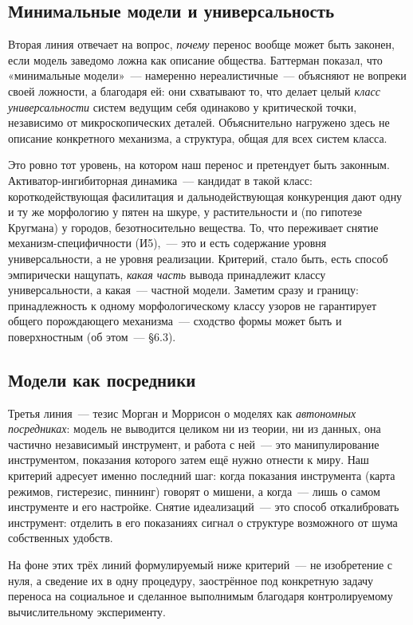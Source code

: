 \documentclass[11pt]{article}
\begin{document}
\subsection{Минимальные модели и универсальность}
Вторая линия отвечает на вопрос, \emph{почему} перенос вообще может быть законен, если модель заведомо ложна как
описание общества. Баттерман \cite{batterman2002} показал, что «минимальные модели»~— намеренно нереалистичные~—
объясняют не вопреки своей ложности, а благодаря ей: они схватывают то, что делает целый \emph{класс
универсальности} систем ведущим себя одинаково у критической точки, независимо от микроскопических деталей.
Объяснительно нагружено здесь не описание конкретного механизма, а структура, общая для всех систем класса.

Это ровно тот уровень, на котором наш перенос и претендует быть законным. Активатор-ингибиторная динамика~—
кандидат в такой класс: короткодействующая фасилитация и дальнодействующая конкуренция дают одну и ту же
морфологию у пятен на шкуре, у растительности и (по гипотезе Кругмана) у городов, безотносительно вещества. То,
что переживает снятие механизм-специфичности (И5),~— это и есть содержание уровня универсальности, а не уровня
реализации. Критерий, стало быть, есть способ эмпирически нащупать, \emph{какая часть} вывода принадлежит классу
универсальности, а какая~— частной модели. Заметим сразу и границу: принадлежность к одному морфологическому
классу узоров не гарантирует общего порождающего механизма~— сходство формы может быть и поверхностным
(об этом~— \S6.3).

\subsection{Модели как посредники}
Третья линия~— тезис Морган и Моррисон \cite{morgan1999} о моделях как \emph{автономных посредниках}: модель не
выводится целиком ни из теории, ни из данных, она частично независимый инструмент, и работа с ней~— это
манипулирование инструментом, показания которого затем ещё нужно отнести к миру. Наш критерий адресует именно
последний шаг: когда показания инструмента (карта режимов, гистерезис, пиннинг) говорят о мишени, а когда~— лишь о
самом инструменте и его настройке. Снятие идеализаций~— это способ откалибровать инструмент: отделить в его
показаниях сигнал о структуре возможного от шума собственных удобств.

На фоне этих трёх линий формулируемый ниже критерий~— не изобретение с нуля, а сведение их в одну процедуру,
заострённое под конкретную задачу переноса на социальное и сделанное выполнимым благодаря контролируемому
вычислительному эксперименту.
\end{document}
